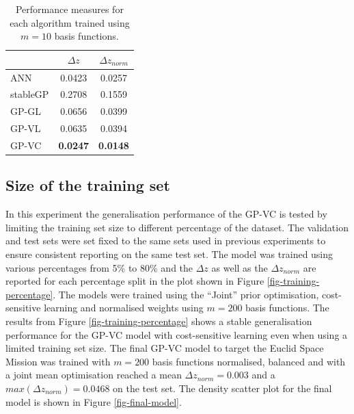\documentclass[useAMS,usenatbib,fleqn]{mn2e}
\begin{document}
 \begin{table}
\caption{Performance measures for each algorithm trained using $m=10$ basis functions.}
\begin{center}
  \begin{tabular}{| l | c | c | }
     				&	$\Delta z$	&	$\Delta z_{norm}$	\\	\hline
	ANN			&	0.0423			&	0.0257				\\
	stableGP		&	0.2708			&	0.1559				\\
	GP-GL		&	0.0656			&	0.0399				\\
	GP-VL		&	0.0635			&	0.0394				\\
	GP-VC		&	\textbf{0.0247}		&	\textbf{0.0148}			\\	\hline
  \end{tabular}
  \label{table-experiment-1}
\end{center}
\end{table}

\subsection{Size of the training set}\label{sec-sizetraining}

In this experiment the generalisation performance of the GP-VC is tested by limiting the training set size to different percentage of the dataset. The validation and test sets were set fixed to the same sets used in previous experiments to ensure consistent reporting on the same test set. The model was trained using various percentages from 5\% to 80\% and the $\Delta z$ as well as the $\Delta z_{norm}$ are reported for each percentage split in the plot shown in Figure \ref{fig-training-percentage}. The models were trained using the ``Joint'' prior optimisation, cost-sensitive learning and normalised weights using $m=200$ basis functions. The results from Figure \ref{fig-training-percentage} shows a stable generalisation performance for the GP-VC model with cost-sensitive learning even when using a limited training set size. The final GP-VC model to target the Euclid Space Mission was trained with $m=200$ basis functions normalised, balanced and with a joint mean optimisation reached a mean $\Delta z_{norm}=0.003$ and a $max\left(\Delta z_{norm}\right)=0.0468$ on the test set. The density scatter plot for the final model is shown in Figure \ref{fig-final-model}.
\end{document}
